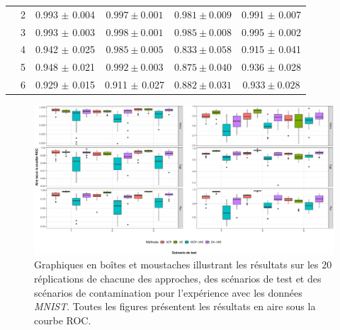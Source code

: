 \begin{table}[h]
\begin{tabular}{|c|c|c c c c|}
		& 2 & 0.993 $\pm$ 0.004 & $\mathbf{0.997 \pm 0.001}$ & $0.981 \pm 0.009$ & 0.991 $\pm$ 0.007   \\
		& 3 & 0.993 $\pm$ 0.003 & $\mathbf{0.998 \pm 0.001}$ & $0.985 \pm 0.008$ & 0.995 $\pm$ 0.002   \\
		& 4 & 0.942 $\pm$ 0.025 & $\mathbf{0.985 \pm 0.005}$ & $0.833 \pm 0.058$ & 0.915 $\pm$ 0.041   \\			
		& 5 & 0.948 $\pm$ 0.021 & $\mathbf{0.992 \pm 0.003}$ & $0.875 \pm 0.040$ & 0.936 $\pm$ 0.028   \\
		& 6 & 0.929 $\pm$ 0.015 & 0.911 $\pm$ 0.027 & $0.882 \pm 0.031$ & $0.933 \pm 0.028$   \\
		\midrule
	\end{tabular} 
	\label{tab:auc_mnist}
\end{table}

\begin{figure}[H]
	\centering
	\includegraphics[width=\linewidth]{images/images_boxplots/auc_mnist.pdf}
	\DIFdelbeginFL %
\DIFdelendFL \DIFaddbeginFL \caption[Graphiques en boîtes et moustaches illustrant les résultats en aire sous la courbe ROC sur les données \textit{MNIST}.]{\DIFaddendFL Graphiques en boîtes et moustaches illustrant les résultats sur les 20 réplications de chacune des approches, des scénarios de test et des scénarios de contamination pour l'expérience avec les données \textit{MNIST}. Toutes les figures présentent les résultats en aire sous la courbe ROC.}
	\label{fig:auc_mnist}
\end{figure}

